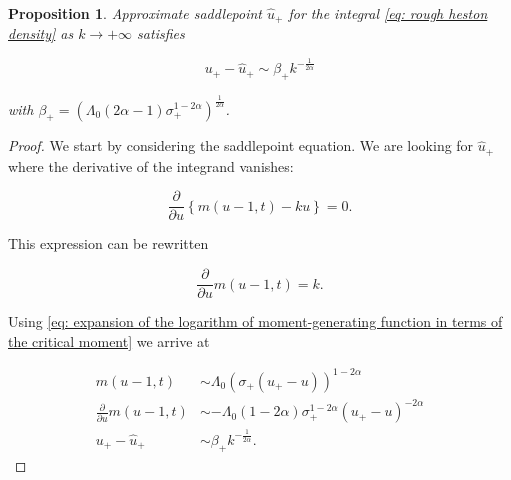 \documentclass[12pt,twoside]{article}
\theoremstyle{plain}
\theoremstyle{plain}
\newtheorem{proposition}{Proposition}[section]
\theoremstyle{definition}
\theoremstyle{remark}
\numberwithin{equation}{section}
\begin{document}
\begin{proposition}
Approximate saddlepoint $\hat u_+$ for the integral \eqref{eq: rough heston density} as $k\rightarrow +\infty$ satisfies

\begin{equation}
\label{eq: approximate saddlepoint}
u_+ - \hat u_+ \sim \beta_+ k ^{-\frac{1}{2\alpha}}
\end{equation}

with $\beta_+ = \left(\Lambda_0(2\alpha -1) \sigma_+ ^ {1-2\alpha}\right)^{\frac{1}{2\alpha}}$.

\end{proposition}

\begin{proof}

We start by considering the saddlepoint equation. We are looking for $\hat u_+$ where the derivative of the integrand vanishes:

\begin{equation}
\label{eq: saddlepoint equation}
\frac{\partial}{\partial u}\left\{m(u - 1, t) - ku\right\} = 0.
\end{equation}

\vspace{5pt}

This expression can be rewritten

\begin{equation}
\label{eq: saddlepoint equation 2}
\frac{\partial}{\partial u}m(u - 1, t) = k.
\end{equation}

Using \eqref{eq: expansion of the logarithm of moment-generating function in terms of the critical moment} we arrive at

$$
\begin{aligned}
m(u - 1,t)&\sim \Lambda_0 (\sigma_+(u_+-u))^{1-2\alpha}\\
\frac{\partial}{\partial u} m(u-1,t) &\sim - \Lambda_0 (1-2\alpha) \sigma_+^{1-2\alpha} (u_+-u)^{-2\alpha}\\
u_+-\hat u_+ &\sim \beta_+ k ^{-\frac{1}{2\alpha}}.
\end{aligned}
$$

\end{proof}
\end{document}
